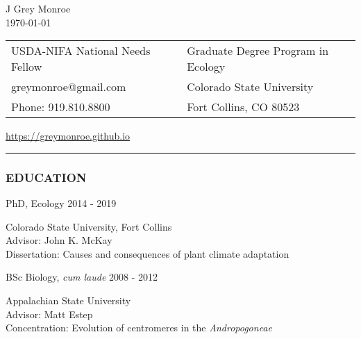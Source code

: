 \documentclass[12pt,english]{article}
\providecommand{\tabularnewline}{\\}
\begin{document}
\begin {center}
{\huge J Grey Monroe}\tabularnewline
\vspace{1em}
\today

\vspace{1em}

\begin{tabular}{>{\raggedright}p{3in}>{\raggedleft}p{3in}}
USDA-NIFA National Needs Fellow & Graduate Degree Program in Ecology\tabularnewline
 greymonroe@gmail.com &  Colorado State University \tabularnewline
Phone: 919.810.8800 & Fort Collins, CO 80523\tabularnewline
\end{tabular}
\href{https://greymonroe.github.io}{https://greymonroe.github.io}
\end{center}
\vspace{-1em}

\rule[0.5ex]{1\columnwidth}{0.5pt}


\subsubsection*{EDUCATION}
\vspace{-0.5ex}

\hspace{1.0em} PhD, Ecology
\hfill
2014 - 2019
\par
\hspace*{2.0em} Colorado State University, Fort Collins \\
\hspace*{2.0em} Advisor: John K. McKay \\
\hspace*{2.0em} Dissertation: Causes and consequences of plant climate adaptation
\\
\vspace{-0.5ex}\par

\hspace{1.0em} BSc Biology, \emph{cum laude}
\hfill
2008 - 2012
\par
\hspace*{2.0em} Appalachian State University \\
\hspace*{2.0em} Advisor: Matt Estep \\
\hspace*{2.0em} Concentration: Evolution of centromeres in the \textit{Andropogoneae} \\
\end{document}
